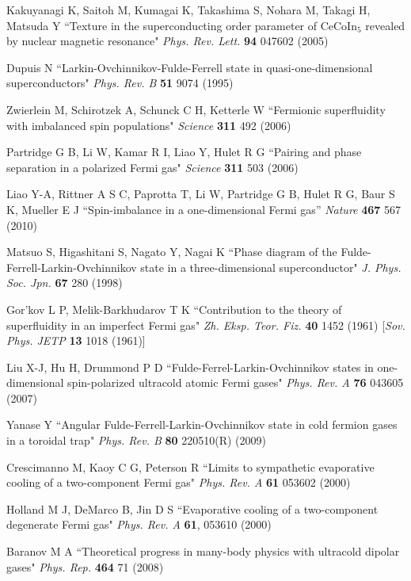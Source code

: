 \documentclass[pra,letterpaper,twocolumn,showpacs,superscriptaddress]{revtex4}
\begin{document}
\begin{thebibliography}{300}
 Kakuyanagi K, Saitoh M, Kumagai K, Takashima S, Nohara M, Takagi H, Matsuda Y 
``Texture in the superconducting order parameter of CeCoIn${}_5$ revealed by nuclear magnetic resonance"
{\it Phys. Rev. Lett.} \textbf{94} 047602 (2005)

 Dupuis N ``Larkin-Ovchinnikov-Fulde-Ferrell state in quasi-one-dimensional superconductors"
{\it Phys. Rev. B} \textbf{51} 9074 (1995)

 Zwierlein M, Schirotzek A, Schunck C H, Ketterle W
``Fermionic superfluidity with imbalanced spin populations" {\it Science} \textbf{311} 492 (2006)

 Partridge G B, Li  W, Kamar R I, Liao Y, Hulet R G ``Pairing and phase separation in a polarized Fermi gas"
{\it Science} \textbf{311} 503 (2006)

 Liao Y-A, Rittner A S C, Paprotta T, Li W, Partridge G B, Hulet R G, Baur S K, Mueller E J 
``Spin-imbalance in a one-dimensional Fermi gas''
{\it Nature} \textbf{467} 567 (2010)

 Matsuo S, Higashitani S, Nagato Y, Nagai K ``Phase diagram of the Fulde-Ferrell-Larkin-Ovchinnikov state in a 
three-dimensional superconductor" {\it J. Phys. Soc. Jpn.} \textbf{67} 280 (1998)

 Gor'kov L P, Melik-Barkhudarov T K ``Contribution to the theory of superfluidity in an imperfect Fermi gas" 
{\it Zh. Eksp. Teor. Fiz.} \textbf{40} 1452 (1961) [{\it Sov. Phys. JETP} \textbf{13} 1018 (1961)] 

 Liu X-J, Hu H, Drummond P D 
``Fulde-Ferrel-Larkin-Ovchinnikov states in one-dimensional spin-polarized ultracold atomic Fermi gases"
{\it Phys. Rev. A} \textbf{76} 043605 (2007)

 Yanase Y ``Angular Fulde-Ferrell-Larkin-Ovchinnikov state in cold fermion gases in a toroidal trap"
{\it Phys. Rev. B} \textbf{80} 220510(R) (2009)

 Crescimanno M, Kaoy C G, Peterson R
``Limits to sympathetic evaporative cooling of a two-component Fermi gas"
{\it Phys. Rev. A} \textbf{61} 053602 (2000)

 Holland M J, DeMarco B, Jin D S
``Evaporative cooling of a two-component degenerate Fermi gas"
{\it Phys. Rev. A} \textbf{61}, 053610 (2000)

 Baranov M A ``Theoretical progress in many-body physics with ultracold dipolar gases"
{\it Phys. Rep.} \textbf{464} 71 (2008)


\end{thebibliography}
\end{document}
